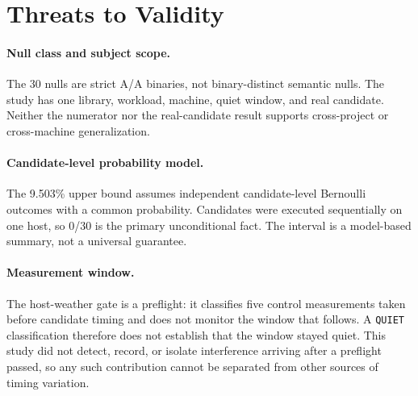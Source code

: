\documentclass[10pt]{article}
\newcommand{\NullUpperBound}{9.503\%}
\begin{document}
\FloatBarrier
\section{Threats to Validity}

\paragraph{Null class and subject scope.}
The 30 nulls are strict A/A binaries, not binary-distinct semantic nulls.  The
study has one library, workload, machine, quiet window, and real candidate.
Neither the numerator nor the real-candidate result supports cross-project or
cross-machine generalization.

\paragraph{Candidate-level probability model.}
The \NullUpperBound{} upper bound assumes independent candidate-level Bernoulli
outcomes with a common probability.  Candidates were executed sequentially on
one host, so 0/30 is the primary unconditional fact.  The interval is a
model-based summary, not a universal guarantee.

\paragraph{Measurement window.}
The host-weather gate is a preflight: it classifies five control measurements
taken before candidate timing and does not monitor the window that follows.  A
\texttt{QUIET} classification therefore does not establish that the window
stayed quiet.  This study did not detect, record, or isolate interference
arriving after a preflight passed, so any such contribution cannot be separated
from other sources of timing variation.
\end{document}
